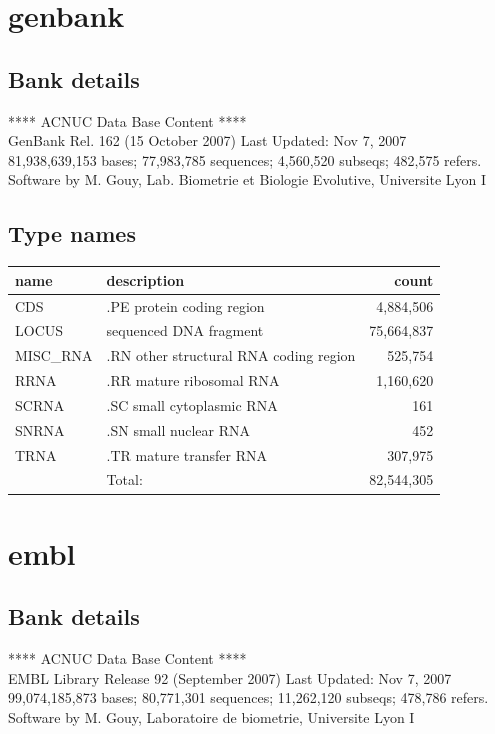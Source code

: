 \documentclass{article}
\begin{document}
\begin{Schunk}
\section{ genbank }
\subsection{Bank details}
             ****     ACNUC Data Base Content      ****                         \\
         GenBank Rel. 162 (15 October 2007) Last Updated: Nov  7, 2007\\
81,938,639,153 bases; 77,983,785 sequences; 4,560,520 subseqs; 482,575 refers.\\
Software by M. Gouy, Lab. Biometrie et Biologie Evolutive, Universite Lyon I 

\subsection{Type names}
\noindent\begin{tabular}{llr}
\hline \hline
name & description & count \\
\hline
CDS  &  .PE protein coding region  &  4,884,506 \\
LOCUS  &  sequenced DNA fragment  &  75,664,837 \\
MISC\_RNA  &  .RN other structural RNA coding region  &  525,754 \\
RRNA  &  .RR mature ribosomal RNA  &  1,160,620 \\
SCRNA  &  .SC small cytoplasmic RNA  &  161 \\
SNRNA  &  .SN small nuclear RNA  &  452 \\
TRNA  &  .TR mature transfer RNA  &  307,975 \\
\hline
 & Total: & 82,544,305 \\
\hline \hline
\end{tabular}

\section{ embl }
\subsection{Bank details}
             ****     ACNUC Data Base Content      ****                         \\
      EMBL Library Release 92 (September 2007) Last Updated: Nov  7, 2007\\
99,074,185,873 bases; 80,771,301 sequences; 11,262,120 subseqs; 478,786 refers.\\
Software by M. Gouy, Laboratoire de biometrie, Universite Lyon I 


\end{Schunk}
\end{document}
